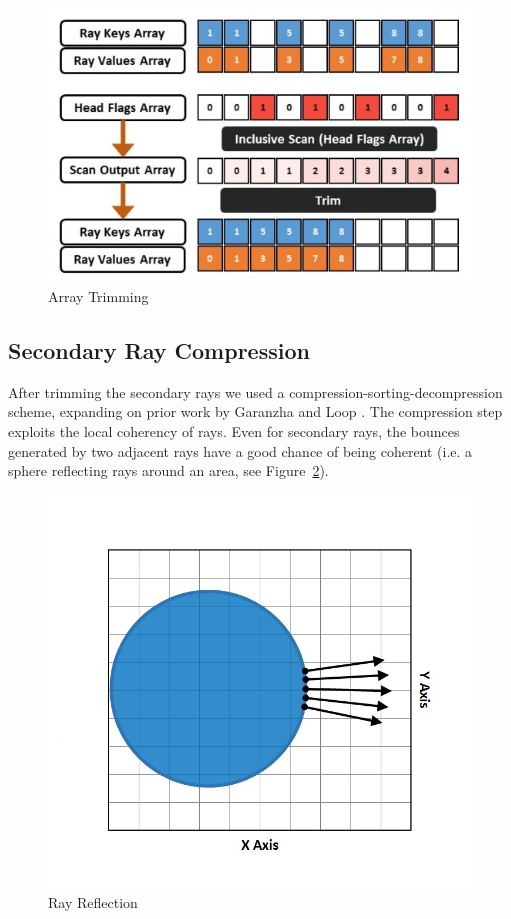 \begin{figure}[!htb]
    \centering
    \includegraphics[scale=0.75]{Images/Array_Trimming}
    \caption{\label{fig:at}Array Trimming}
\end{figure}

\subsection{Secondary Ray Compression}

After trimming the secondary rays we used a compression-sorting-decompression scheme, expanding on prior work by Garanzha and Loop \cite{Garanzha10}. The compression step exploits the local coherency of rays. Even for secondary rays, the bounces generated by two adjacent rays have a good chance of being coherent (i.e. a sphere reflecting rays around an area, see Figure~\ref{fig:rr}). 

\begin{figure}[!htb]
    \centering
    \includegraphics[scale=0.325]{Images/Ray_Reflection}
    \caption{\label{fig:rr}Ray Reflection}
\end{figure}

